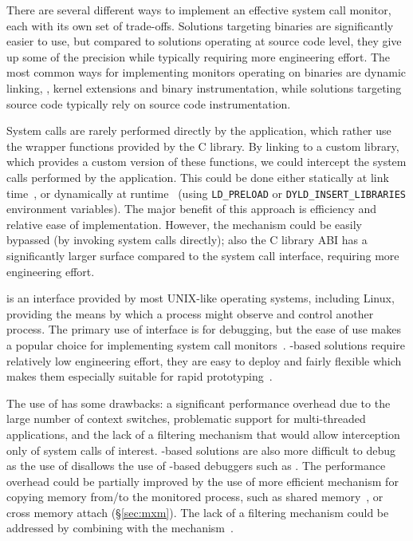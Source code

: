 There are several different ways to implement an effective system call monitor,
each with its own set of trade-offs. Solutions targeting binaries are
significantly easier to use, but compared to solutions operating at source code
level, they give up some of the precision while typically requiring more
engineering effort. The most common ways for implementing monitors operating on
binaries are dynamic linking, \ptrace, kernel extensions and binary
instrumentation, while solutions targeting source code typically rely on source
code instrumentation.

System calls are rarely performed directly by the application, which rather use
the wrapper functions provided by the C library. By linking to a custom
library, which provides a custom version of these functions, we could intercept
the system calls performed by the application. This could be done either
statically at link time~\cite{plash}, or dynamically at
runtime~\cite{shepherding:pldi14} (\eg using \lstinline`LD_PRELOAD` or
\lstinline`DYLD_INSERT_LIBRARIES` environment variables). The major benefit of
this approach is efficiency and relative ease of implementation. However, the
mechanism could be easily bypassed (\eg by invoking system calls directly);
also the C library ABI has a significantly larger surface compared to the
system call interface, requiring more engineering effort.

\ptrace is an interface provided by most UNIX-like operating systems, including
Linux, providing the means by which a process might observe and control another
process. The primary use of \ptrace interface is for debugging, but the ease of
use makes \ptrace a popular choice for implementing system call
monitors~\cite{wily-hacker,orchestra09,tachyon12}. \ptrace-based solutions
require relatively low engineering effort, they are easy to deploy and fairly
flexible which makes them especially suitable for rapid
prototyping~\cite{spillane07}.

The use of \ptrace has some drawbacks: a significant performance overhead due
to the large number of context switches, problematic support for multi-threaded
applications, and the lack of a filtering mechanism that would allow
interception only of system calls of interest. \ptrace-based solutions are also
more difficult to debug as the use of \ptrace disallows the use of
\ptrace-based debuggers such as \gdb. The performance overhead could be
partially improved by the use of more efficient mechanism for copying memory
from/to the monitored process, such as shared memory~\cite{orchestra09}, or
cross memory attach (\S\ref{sec:mxm}). The lack of a filtering mechanism could
be addressed by combining \ptrace with the \seccompbpf mechanism~\cite{mbox}.

